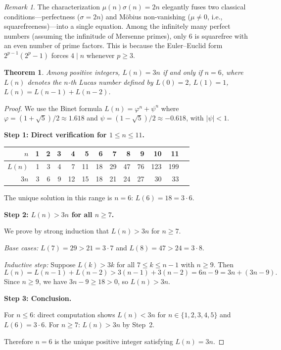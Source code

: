 \documentclass[11pt]{amsart}
\newtheorem{theorem}{Theorem}
\theoremstyle{remark}
\newtheorem*{remark}{Remark}
\begin{document}
\begin{remark}
The characterization $\mu(n)\sigma(n) = 2n$ elegantly fuses two
classical conditions---perfectness ($\sigma = 2n$) and Möbius
non-vanishing ($\mu \neq 0$, i.e., squarefreeness)---into a
single equation. Among the infinitely many perfect numbers
(assuming the infinitude of Mersenne primes), only $6$ is squarefree
with an even number of prime factors. This is because the Euler--Euclid
form $2^{p-1}(2^p-1)$ forces $4 \mid n$ whenever $p \geq 3$.
\end{remark}

\begin{theorem}\label{thm:lucas}
Among positive integers, $L(n) = 3n$ if and only if $n = 6$,
where $L(n)$ denotes the $n$-th Lucas number defined by
$L(0) = 2$, $L(1) = 1$, $L(n) = L(n-1) + L(n-2)$.
\end{theorem}

\begin{proof}
We use the Binet formula $L(n) = \varphi^n + \psi^n$ where
$\varphi = (1+\sqrt{5})/2 \approx 1.618$ and
$\psi = (1-\sqrt{5})/2 \approx -0.618$, with $|\psi| < 1$.

\textbf{Step 1: Direct verification for $1 \leq n \leq 11$.}

\begin{center}
\begin{tabular}{r|rrrrrrrrrrrr}
$n$ & 1 & 2 & 3 & 4 & 5 & 6 & 7 & 8 & 9 & 10 & 11 \\
\hline
$L(n)$ & 1 & 3 & 4 & 7 & 11 & 18 & 29 & 47 & 76 & 123 & 199 \\
$3n$ & 3 & 6 & 9 & 12 & 15 & 18 & 21 & 24 & 27 & 30 & 33 \\
\end{tabular}
\end{center}

The unique solution in this range is $n = 6$: $L(6) = 18 = 3 \cdot 6$.

\textbf{Step 2: $L(n) > 3n$ for all $n \geq 7$.}

We prove by strong induction that $L(n) > 3n$ for $n \geq 7$.

\emph{Base cases:} $L(7) = 29 > 21 = 3 \cdot 7$ and
$L(8) = 47 > 24 = 3 \cdot 8$.

\emph{Inductive step:} Suppose $L(k) > 3k$ for all $7 \leq k \leq n-1$
with $n \geq 9$. Then
\[
  L(n) = L(n-1) + L(n-2) > 3(n-1) + 3(n-2) = 6n - 9 = 3n + (3n - 9).
\]
Since $n \geq 9$, we have $3n - 9 \geq 18 > 0$, so $L(n) > 3n$.

\textbf{Step 3: Conclusion.}

For $n \leq 6$: direct computation shows $L(n) < 3n$ for $n \in \{1,2,3,4,5\}$
and $L(6) = 3 \cdot 6$.
For $n \geq 7$: $L(n) > 3n$ by Step~2.

Therefore $n = 6$ is the unique positive integer satisfying $L(n) = 3n$.
\end{proof}
\end{document}
